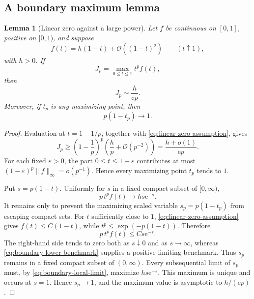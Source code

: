 \documentclass[11pt,oneside]{article}
\newtheorem{lemma}[lemma]{Lemma}
\theoremstyle{definition}
\theoremstyle{remark}
\newcommand{\e}{\mathrm e}
\newcommand{\bigO}{\mathcal O}
\newcommand{\smallo}{o}
\begin{document}
\subsection{A boundary maximum lemma}

\begin{lemma}[Linear zero against a large power]
\label{lem:boundary-maximum}
Let \(f\) be continuous on \([0,1]\), positive on \([0,1)\), and suppose
\begin{equation}
 f(t)=h(1-t)+\bigO((1-t)^2)
 \qquad(t\uparrow1),
 \label{eq:linear-zero-assumption}
\end{equation}
with \(h>0\).  If
\[
 J_p=\max_{0\le t\le1}t^pf(t),
\]
then
\begin{equation}
 J_p\sim\frac{h}{\e p}.
 \label{eq:boundary-max-value}
\end{equation}
Moreover, if \(t_p\) is any maximizing point, then
\begin{equation}
 p(1-t_p)\longrightarrow1.
 \label{eq:boundary-max-location}
\end{equation}
\end{lemma}

\begin{proof}
Evaluation at \(t=1-1/p\), together with
\eqref{eq:linear-zero-assumption}, gives
\begin{equation}
 J_p\ge \left(1-\frac1p\right)^p
 \left(\frac hp+\bigO(p^{-2})\right)
 =\frac{h+\smallo(1)}{\e p}.
 \label{eq:boundary-lower-benchmark}
\end{equation}
For each fixed \(\varepsilon>0\), the part \(0\le t\le1-\varepsilon\)
contributes at most
\((1-\varepsilon)^p\|f\|_\infty=\smallo(p^{-1})\).  Hence every maximizing
point \(t_p\) tends to \(1\).

Put \(s=p(1-t)\).  Uniformly for \(s\) in a fixed compact subset of
\([0,\infty)\),
\begin{equation}
 p\,t^pf(t)\longrightarrow hs\e^{-s}.
 \label{eq:boundary-local-limit}
\end{equation}
It remains only to prevent the maximizing scaled variable
\(s_p=p(1-t_p)\) from escaping compact sets.  For \(t\) sufficiently close
to \(1\), \eqref{eq:linear-zero-assumption} gives
\(f(t)\le C(1-t)\), while
\(t^p\le\exp(-p(1-t))\).  Therefore
\begin{equation}
 p\,t^pf(t)\le C s\e^{-s}.
 \label{eq:boundary-tail-control}
\end{equation}
The right-hand side tends to zero both as \(s\downarrow0\) and as
\(s\to\infty\), whereas \eqref{eq:boundary-lower-benchmark} supplies a
positive limiting benchmark.  Thus \(s_p\) remains in a fixed compact
subset of \((0,\infty)\).  Every subsequential limit of \(s_p\) must, by
\eqref{eq:boundary-local-limit}, maximize \(hs\e^{-s}\).  This maximum is
unique and occurs at \(s=1\).  Hence \(s_p\to1\), and the maximum value is
asymptotic to \(h/(\e p)\).
\end{proof}
\end{document}
